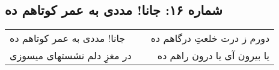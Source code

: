 \begin{center}
\section*{شماره ۱۶: جانا! مددی به عمر کوتاهم ده}
\label{sec:016}
\begin{longtable}{l p{0.5cm} r}
جانا! مددی به عمر کوتاهم ده
&&
دورم ز درت خلعتِ درگاهم ده
\\
در مغزِ دلم نشستهای میسوزی
&&
یا بیرون آی یا درون راهم ده
\\
\end{longtable}
\end{center}
